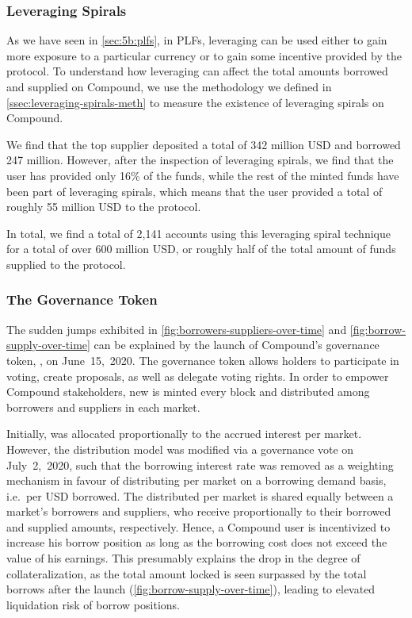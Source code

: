 \subsubsection{Leveraging Spirals}
As we have seen in \autoref{sec:5b:plfs}, in PLFs, leveraging can be used either to gain more exposure to a particular currency or to gain some incentive provided by the protocol.
To understand how leveraging can affect the total amounts borrowed and supplied on Compound, we use the methodology we defined in \autoref{ssec:leveraging-spirals-meth} to measure the existence of leveraging spirals on Compound.

We find that the top supplier deposited a total of 342 million USD and borrowed 247 million.
However, after the inspection of leveraging spirals, we find that the user has provided only 16\% of the funds, while the rest of the minted funds have been part of leveraging spirals, which means that the user provided a total of roughly 55 million USD to the protocol.

In total, we find a total of 2,141 accounts using this leveraging spiral technique for a total of over 600 million USD, or roughly half of the total amount of funds supplied to the protocol.

\subsubsection{The  Governance Token}
The sudden jumps exhibited in \autoref{fig:borrowers-suppliers-over-time} and \autoref{fig:borrow-supply-over-time} can be explained by the launch of Compound's governance token, , on June~15,~2020.
The  governance token allows holders to participate in voting, create proposals, as well as delegate voting rights.
In order to empower Compound stakeholders, new  is minted every block and distributed among borrowers and suppliers in each market.

Initially,  was allocated proportionally to the accrued interest per market.
However, the  distribution model was modified via a governance vote on July~2,~2020, such that the borrowing interest rate was removed as a weighting mechanism in favour of distributing  per market on a borrowing demand basis, i.e.\ per USD borrowed.
The distributed  per market is shared equally between a market's borrowers and suppliers, who receive  proportionally to their borrowed and supplied amounts, respectively.
Hence, a Compound user is incentivized to increase his borrow position as long as the borrowing cost does not exceed the value of his  earnings. This presumably explains the drop in the degree of collateralization, as the total amount locked is seen surpassed by the total borrows after the  launch (\autoref{fig:borrow-supply-over-time}), leading to elevated liquidation risk of borrow positions.


